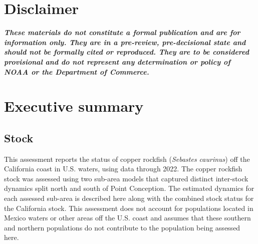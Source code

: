 \documentclass[11pt,
  english,
  letterpaper,
]{article}
\begin{document}
\pagestyle{plain}  %
\renewcommand*{\thefootnote}{\arabic{footnote}}  %
\setcounter{footnote}{0}  %
\renewcommand{\headrulewidth}{0.5pt}
\renewcommand{\footrulewidth}{0.5pt}

\newcommand{\lt}{\ensuremath <}
\newcommand{\gt}{\ensuremath >}

\linenumbers

\newcommand\CapeM{$40^\circ 10^\prime N$}
\newcommand\PtC{$34^\circ 27^\prime N$}
\newcommand\CAOR{$42^\circ 00^\prime N$}

\pagebreak
{}
\setcounter{page}{1}

\renewcommand{\thetable}{\roman{table}}
\renewcommand{\thefigure}{\roman{figure}}

\setlength\parskip{0.5em plus 0.1em minus 0.2em}

\vspace{500cm}

\hypertarget{disclaimer}{%
\section*{Disclaimer}\label{disclaimer}}

\emph{\textbf{These materials do not constitute a formal publication and are for information only. They are in a pre-review, pre-decisional state and should not be formally cited or reproduced. They are to be considered provisional and do not represent any determination or policy of NOAA or the Department of Commerce.}}

\pagebreak

\hypertarget{executive-summary}{%
\section*{Executive summary}\label{executive-summary}}

\hypertarget{stock}{%
\subsection*{Stock}\label{stock}}

This assessment reports the status of copper rockfish (\emph{Sebastes caurinus}) off the California coast in U.S. waters, using data through 2022. The copper rockfish stock was assessed using two sub-area models that captured distinct inter-stock dynamics split north and south of Point Conception. The estimated dynamics for each assessed sub-area is described here along with the combined stock status for the California stock. This assessment does not account for populations located in Mexico waters or other areas off the U.S. coast and assumes that these southern and northern populations do not contribute to the population being assessed here.
\end{document}
